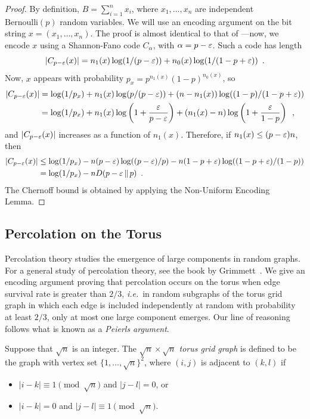 \documentclass{patmorin}
\begin{document}
\begin{proof}
  By definition, $B=\sum_{i=1}^n x_i$, where $x_1,\ldots,x_n$ are
  independent $\mathrm{Bernoulli}(p)$ random variables.  We will use
  an encoding argument on the bit string $x=(x_1,\ldots,x_n)$. The
  proof is almost identical to that of ---now,
  we encode $x$ using a Shannon-Fano code $C_\alpha$, with
  $\alpha = p - \varepsilon$. Such a code has length
  \[
    |C_{p - \varepsilon}(x)| = n_1(x) \log (1/(p - \varepsilon)) + n_0(x) \log (1/(1
    - p + \varepsilon)) \enspace .
  \]
  Now, $x$ appears with probability
  $p_x = p^{n_1(x)} (1 - p)^{n_0(x)}$, so
  \begin{align*}
    |C_{p - \varepsilon}(x)| &= \log(1/p_x) + 
         n_1(x) \log (p/(p - \varepsilon)) + (n - n_1(x)) \log ((1 - p)/(1 - p + \varepsilon)) \\
         &= \log (1/p_x) + n_1(x) \log \left(1 + \frac{\varepsilon}{p - \varepsilon}\right) + 
(n_1(x) - n) \log \left(1 + \frac{\varepsilon}{1 - p}\right) \enspace ,
  \end{align*}
  and $|C_{p - \varepsilon}(x)|$ increases as a function of
  $n_1(x)$. Therefore, if $n_1(x) \le (p - \varepsilon)n$, then
  \begin{align*}
    |C_{p - \varepsilon}(x)| &\le \log (1/p_x) - n (p - \varepsilon) \log ((p - \varepsilon)/p) - n (1 - p + \varepsilon) \log ((1 - p + \varepsilon)/(1 - p)) \\
                      &= \log (1/p_x) - n D(p - \varepsilon \,\|\, p) \enspace .
  \end{align*}
  The Chernoff bound is obtained by applying the Non-Uniform Encoding
  Lemma.
\end{proof}

\subsection{Percolation on the Torus}

Percolation theory studies the emergence of large components in random
graphs. For a general study of percolation theory, see the book by
Grimmett~\cite{grimmett:percolation}.  We give an encoding argument
proving that percolation occurs on the torus when edge survival rate
is greater than $2/3$, \emph{i.e.}~in random subgraphs of the torus
grid graph in which each edge is included independently at random with
probability at least $2/3$, only at most one large component
emerges. Our line of reasoning follows what is known as a
\emph{Peierls argument}.

Suppose that $\sqrt{n}$ is an integer. The \emph{$\sqrt{n} \times \sqrt{n}$
  torus grid graph} is defined to be the graph with vertex set
$\{1, \ldots, \sqrt{n}\}^2$, where $(i, j)$ is adjacent to $(k, l)$
if
\begin{itemize}[topsep=0pt]
\item $|i - k| \equiv 1 \pmod{\sqrt{n}}$ and $|j - l| = 0$, or
\item $|i - k| = 0$ and $|j - l| \equiv 1 \pmod{\sqrt{n}}$.
\end{itemize}
\end{document}
